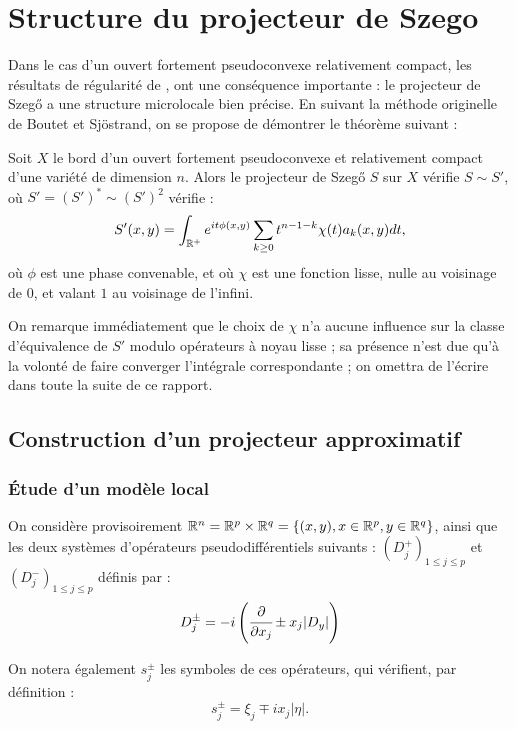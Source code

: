 \section{Structure du projecteur de Szego}

Dans le cas d'un ouvert fortement pseudoconvexe relativement compact, les résultats de régularité de \cite{kohn1963harmonic}, \cite{kohn1964harmonic} ont une conséquence importante : le projecteur de Szeg\H{o} a une structure microlocale bien précise. En suivant la méthode originelle de Boutet et Sjöstrand, on se propose de démontrer le théorème suivant :

\begin{theorem}
  Soit $X$ le bord d'un ouvert fortement pseudoconvexe et relativement compact d'une variété de dimension $n$. Alors le projecteur de Szeg\H{o} $S$ sur $X$ vérifie $S\sim S'$, où $S' = (S')^* \sim (S')^2$ vérifie :
  \begin{equation*}
    S'(x,y) = \int_{\mathbb{R}^+} e^{it\phi(x,y)}\sum_{k \geq 0}t^{n-1-k}\chi(t)a_k(x,y)dt,
  \end{equation*}
  \noindent où $\phi$ est une phase convenable, et où $\chi$ est une fonction lisse, nulle au voisinage de $0$, et valant $1$ au voisinage de l'infini.
\end{theorem}

On remarque immédiatement que le choix de $\chi$ n'a aucune influence sur la classe d'équivalence de $S'$ modulo opérateurs à noyau lisse ; sa présence n'est due qu'à la volonté de faire converger l'intégrale correspondante ; on omettra de l'écrire dans toute la suite de ce rapport.
\subsection{Construction d'un projecteur approximatif}

\subsubsection{Étude d'un modèle local}
On considère provisoirement $\mathbb{R}^n = \mathbb{R}^p \times \mathbb{R}^q = \{(x,y), x \in \mathbb{R}^p, y \in \mathbb{R}^q\}$, ainsi que les deux systèmes d'opérateurs pseudodifférentiels suivants : $(D^+_j)_{1 \leq j \leq p}$ et $(D^-_j)_{1 \leq j \leq p}$ définis par :
\begin{equation*}
  D^{\pm}_j = -i\left(\cfrac{\partial}{\partial x_j} \pm x_j |D_y|\right)
\end{equation*}

\noindent On notera également $s_j^{\pm}$ les symboles de ces opérateurs, qui vérifient, par définition :
\begin{equation*}
  s^{\pm}_j = \xi_j \mp i x_j|\eta|.
\end{equation*}

